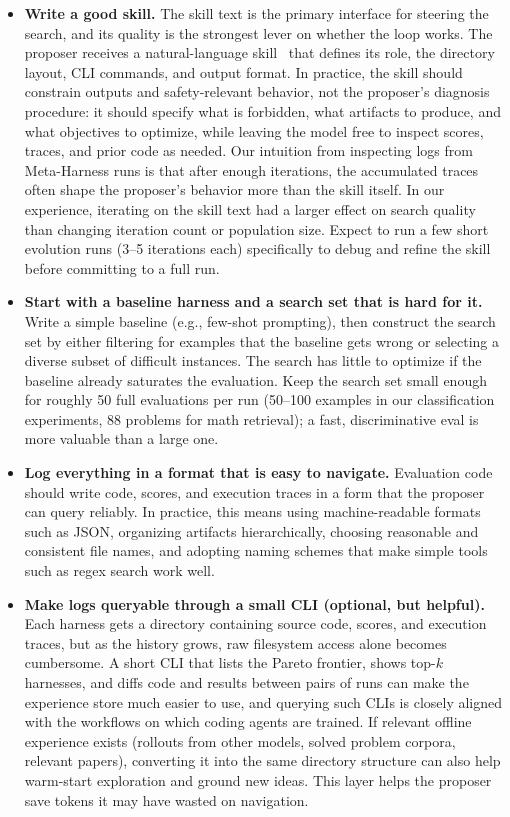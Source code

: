 \begin{itemize}[leftmargin=*]

\item \textbf{Write a good skill.}
The skill text is the primary interface for steering the search, and its quality is the strongest lever on whether the loop works.
The proposer receives a natural-language skill~\citep{agentskills} that defines its role, the directory layout, CLI commands, and output format.
In practice, the skill should constrain outputs and safety-relevant behavior, not the proposer's diagnosis procedure: it should specify what is forbidden, what artifacts to produce, and what objectives to optimize, while leaving the model free to inspect scores, traces, and prior code as needed.
Our intuition from inspecting logs from Meta-Harness runs is that after enough iterations, the accumulated traces often shape the proposer's behavior more than the skill itself.
In our experience, iterating on the skill text had a larger effect on search quality than changing iteration count or population size.
Expect to run a few short evolution runs (3--5 iterations each) specifically to debug and refine the skill before committing to a full run.

\item \textbf{Start with a baseline harness and a search set that is hard for it.}
Write a simple baseline (e.g., few-shot prompting), then construct the search set by either filtering for examples that the baseline gets wrong or selecting a diverse subset of difficult instances.
The search has little to optimize if the baseline already saturates the evaluation.
Keep the search set small enough for roughly 50 full evaluations per run (50--100 examples in our classification experiments, 88 problems for math retrieval); a fast, discriminative eval is more valuable than a large one.

\item \textbf{Log everything in a format that is easy to navigate.}
Evaluation code should write code, scores, and execution traces in a form that the proposer can query reliably.
In practice, this means using machine-readable formats such as JSON, organizing artifacts hierarchically, choosing reasonable and consistent file names, and adopting naming schemes that make simple tools such as regex search work well.

\item \textbf{Make logs queryable through a small CLI (optional, but helpful).}
Each harness gets a directory containing source code, scores, and execution traces, but as the history grows, raw filesystem access alone becomes cumbersome.
A short CLI that lists the Pareto frontier, shows top-$k$ harnesses, and diffs code and results between pairs of runs can make the experience store much easier to use, and querying such CLIs is closely aligned with the workflows on which coding agents are trained.
If relevant offline experience exists (rollouts from other models, solved problem corpora, relevant papers), converting it into the same directory structure can also help warm-start exploration and ground new ideas.
This layer helps the proposer save tokens it may have wasted on navigation.


\end{itemize}
